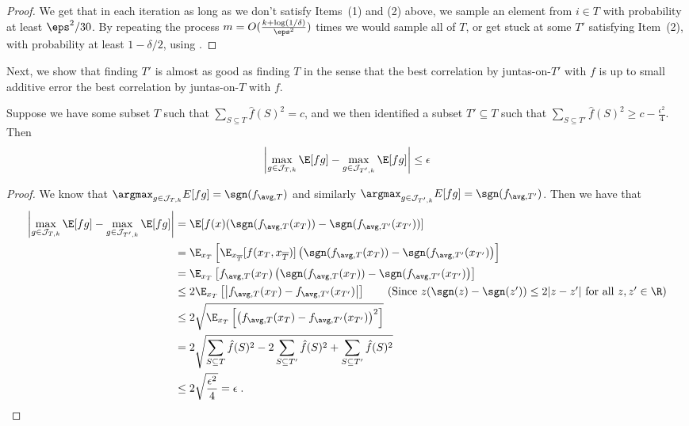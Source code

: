 \begin{proof}
We get that in each iteration as long as we don't satisfy Items~(1) and (2) above, we sample an element from $i\in T$ with probability at least $\eps^2/30$. By repeating the process $m = O(\frac{k+\log(1/\delta)}{\eps^2})$ times we would sample all of $T$, or get stuck at some $T'$ satisfying Item~(2), with probability at least $1-\delta/2$, using .
\end{proof}

Next, we show that finding $T'$ is almost as good as finding $T$ in the sense that the best correlation by juntas-on-$T'$ with $f$ is up to small additive error the best correlation by juntas-on-$T$ with $f$.
\begin{lemma}
\label{lemma:small-mass-loss-okay}
Suppose we have some subset $T$ such that $\sum_{S\subseteq T} \hat{f}(S)^2  = c$, and we then identified a subset $T' \subseteq T$ such that $\sum_{S \subseteq T'} \hat{f}(S)^2 \geq c - \frac{\epsilon^2}{4}$. Then 
$$\left | \max_{g \in \mathcal{J}_{T,k}} \E[fg] -  \max_{g \in \mathcal{J}_{T',k}} \E[fg] \right | \leq \epsilon$$
\end{lemma}
\begin{proof}
We know that $\argmax_{g \in \mathcal{J}_{T,k}}E[fg] = \sgn(f_{\avg,T})$ and similarly $\argmax_{g \in \mathcal{J}_{T',k}}E[fg] = \sgn(f_{\avg,T'})$. 
Then we have that 
\begin{align*}
\left | \max_{g \in \mathcal{J}_{T,k}} \E[fg] -  \max_{g \in \mathcal{J}_{T',k}} \E[fg] \right | &= \E[f(x)(\sgn(f_{\avg,T}(x_T)) - \sgn(f_{\avg,T'}(x_{T'}))] \\
&= \E_{x_T}\left [ \E_{x_{\overline{T}}} [f(x_T, x_{\overline{T}})] \left (\sgn(f_{\avg,T}(x_T)) - \sgn(f_{\avg,T'}(x_{T'})\right )\right ] \\
&= \E_{x_T}\left [ f_{\avg,T}(x_T) \left (\sgn(f_{\avg,T}(x_T)) - \sgn(f_{\avg,T'}(x_{T'})\right )\right ] \\
&\leq 2 \E_{x_T}\left [ \left |f_{\avg,T}(x_T) - f_{\avg,T'}(x_{T'})\right |\right ] \tag{Since $z(\sgn(z) - \sgn(z')) \leq 2 |z - z'|$ for all $z,z'\in \R$} \\
&\leq 2 \sqrt{\E_{x_T}\left [ \left (f_{\avg,T}(x_T) - f_{\avg,T'}(x_{T'})\right )^2\right ]} \\
&= 2 \sqrt{\sum_{S \subseteq T} \hat{f}(S)^2 - 2 \sum_{S \subseteq T'} \hat{f}(S)^2 + \sum_{S \subseteq T'} \hat{f}(S)^2} \\
&\leq 2 \sqrt{\frac{\epsilon^2}{4}} = \epsilon\;.\qedhere
\end{align*}
\end{proof}

